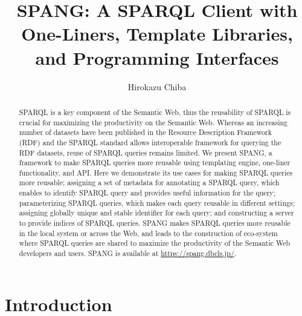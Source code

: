 \documentclass[runningheads]{llncs}
\begin{document}
\title{SPANG: A SPARQL Client with One-Liners, Template Libraries, and Programming Interfaces}
\author{Hirokazu Chiba}
%
\maketitle              %
%
\begin{abstract}
SPARQL is a key component of the Semantic Web, thus the reusability of SPARQL is crucial for maximizing the productivity on the Semantic Web.
Whereas an increasing number of datasets have been published in the Resource Description Framework (RDF) and the SPARQL standard allows interoperable framework for querying the RDF datasets, reuse of SPARQL queries remains limited. We present SPANG, a framework to make SPARQL queries more reusable using templating engine, one-liner functionality, and API. Here we demonstrate its use cases for making SPARQL queries more reusable; assigning a set of metadata for annotating a SPARQL query, which enables to identify SPARQL query and provides useful information for the query; parameterizing SPARQL queries, which makes each query reusable in different settings; assigning globally unique and stable identifier for each query; and constructing a server to provide indices of SPARQL queries. SPANG makes SPARQL queries more reusable in the local system or across the Web, and leads to the construction of eco-system where SPARQL queries are shared to maximize the productivity of the Semantic Web developers and users. SPANG is available at \url{https://spang.dbcls.jp/}.


\end{abstract}


\section{Introduction}
\end{document}
